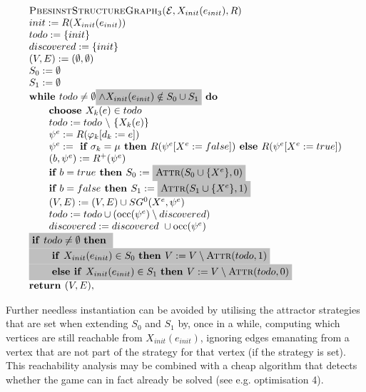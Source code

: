 \documentclass{article}
\newcommand{\Space}{\text{\ }}
\newcommand{\If}{\text{\textbf{if }}}
\newcommand{\Then}{\text{\textbf{then }}}
\newcommand{\Else}{\text{\textbf{else }}}
\begin{document}
\begin{equation*}
\begin{array}{l}
\textsc{PbesinstStructureGraph$_{3}$(}\mathcal{E}, X_{init}(e_{init}), R) \\ 
init:=R(X_{init}(e_{init})) \\
todo:=\{init\} \\
discovered:=\{init\} \\
(V,E) :=(\emptyset ,\emptyset ) \\ 
S_0:= \emptyset \\
S_1:= \emptyset \\
\textbf{while }todo\neq \emptyset
\colorbox{lightgray}{$\wedge X_{init}(e_{init}) \notin S_0 \cup S_1 $}
\textbf{ do} \\ 
\qquad \text{\textbf{choose }}X_{k}(e)\in todo \\ 
\qquad todo:=todo\ \backslash \ \{X_{k}(e)\} \\ 
\qquad \psi ^{e}:=R(\varphi _{k}[d_{k}:=e]) \\ 
\qquad \psi^e := \textbf{ if } \sigma_k = \mu \textbf{ then } R(\psi^e[X^e := false])
\textbf{ else }  R(\psi^e[X^e := true]) \\
\qquad (b,\psi^e) := R^+(\psi^e) \\
\qquad \textbf{if $b = true$ then } S_0 := \colorbox{lightgray}{$%
\textsc{Attr}(S_0 \cup \{ X^e \}, 0) $}\\
\qquad \textbf{if $b = false$ then } S_1 := \colorbox{lightgray}{$%
\textsc{Attr}(S_1 \cup \{ X^e \}, 1) $}\\
\qquad (V,E) := (V,E) \cup SG^{0}(X^{e},\psi ^{e}) \\ 
\qquad todo:=todo\cup (\mathrm{occ}(\psi ^{e})\setminus discovered) \\
\qquad discovered:=discovered\ \cup \mathrm{occ}(\psi ^{e}) \\
\colorbox{lightgray}{$
\If todo \neq \emptyset \Space \Then$} \\
\colorbox{lightgray}{$
\qquad \If X_{init}(e_{init}) \in S_0  \Space \Then V := V \setminus \textsc{Attr}(todo, 1)
$}\\
\colorbox{lightgray}{$
\qquad \Else \If X_{init}(e_{init}) \in S_1 \Space \Then V := V \setminus \textsc{Attr}(todo, 0)
$}\\
\textbf{return }(V, E),
\end{array}
\end{equation*}

Further needless instantiation can be avoided by utilising the attractor
strategies that are set when extending $S_0$ and $S_1$ by, once in a while, computing
which vertices are still reachable from $X_\textit{init}(e_\textit{init})$, ignoring
edges emanating from a vertex that are not part of the strategy for that vertex (if the
strategy is set). This reachability analysis may be combined with a cheap algorithm that
detects whether the game can in fact already be solved (see e.g. optimisation 4). 
\end{document}
